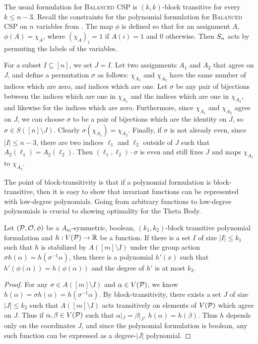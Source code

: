 \begin{example}\label{ex:bcsp-blocktransitive}
The usual formulation for \textsc{Balanced CSP} is $(k,k)$-block transitive for every $k \leq n-3$. Recall the constraints for the polynomial formulation for \textsc{Balanced CSP} on $n$ variables from . The map $\phi$ is defined so that for an assignment $A$, $\phi(A) = \chi_A$, where $(\chi_A)_i = 1$ if $A(i) = 1$ and $0$ otherwise. Then $S_{n}$ acts by permuting the labels of the variables.

For a subset $I \subseteq [n]$, we set $J = I$. Let two assignments $A_1$ and $A_2$ that agree on $J$, and define a permutation $\sigma$ as follows: $\chi_{A_1}$ and $\chi_{A_2}$ have the same number of indices which are zero, and indices which are one. Let $\sigma$ be any pair of bijections between the indices which are one in $\chi_{A_1}$ and the indices which are one in $\chi_{A_2}$, and likewise for the indices which are zero. Furthermore, since $\chi_{A_1}$ and $\chi_{A_2}$ agree on $J$, we can choose $\sigma$ to be a pair of bijections which are the identity on $J$, so $\sigma \in S([n] \setminus J)$. Clearly $\sigma(\chi_{A_1}) = \chi_{A_2}$. Finally, if $\sigma$ is not already even, since $|I| \leq n-3$, there are two indices $\ell_1$ and $\ell_2$ outside of $J$ such that $A_2(\ell_1) = A_2(\ell_2)$. Then $(\ell_1, \ell_2) \cdot \sigma$ is even and still fixes $J$ and maps $\chi_{A_1}$ to $\chi_{A_2}$.
\end{example}

The point of block-transitivity is that if a polynomial formulation is block-transitive, then it is easy to show that invariant functions can be represented with low-degree polynomials. Going from arbitrary functions to low-degree polynomials is crucial to showing optimality for the Theta Body.  
\begin{lemma}\label{lem:functopoly}
Let $(\mathcal P, \mathcal O, \phi)$ be a $A_m$-symmetric, boolean, $(k_1,k_2)$-block transitive polynomial formulation and $h: V(\mathcal P) \rightarrow \mathbb R$ be a function. If there is a set $I$ of size $|I| \leq k_1$ such that $h$ is stabilized by $A([m] \setminus I)$ under the group action $\sigma h(\alpha) = h(\sigma^{-1} \alpha)$, then there is a polynomial $h'(x)$ such that $h'(\phi(\alpha)) = h(\phi(\alpha))$ and the degree of $h'$ is at most $k_2$. 
\end{lemma}
\begin{proof}
For any $\sigma \in A([m] \setminus I)$ and $\alpha \in V(\mathcal P)$, we know $h(\alpha) = \sigma h(\alpha) = h(\sigma^{-1} \alpha)$. By block-transitivity, there exists a set $J$ of size $|J| \leq k_2$ such that $A([m]\setminus I)$ acts transitively on elements of $V(\mathcal P)$ which agree on $J$. Thus if $\alpha,\beta \in V(\mathcal P)$ such that $\alpha|_J = \beta|_J$, $h(\alpha) = h(\beta)$. Thus $h$ depends only on the coordinates $J$, and since the polynomial formulation is boolean, any such function can be expressed as a degree-$|J|$ polynomial. 
\end{proof} 

